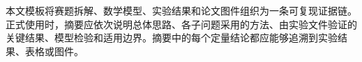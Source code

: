 本文模板将赛题拆解、数学模型、实验结果和论文图件组织为一条可复现证据链。正式使用时，摘要应依次说明总体思路、各子问题采用的方法、由实验文件验证的关键结果、模型检验和适用边界。摘要中的每个定量结论都应能够追溯到实验结果、表格或图件。
